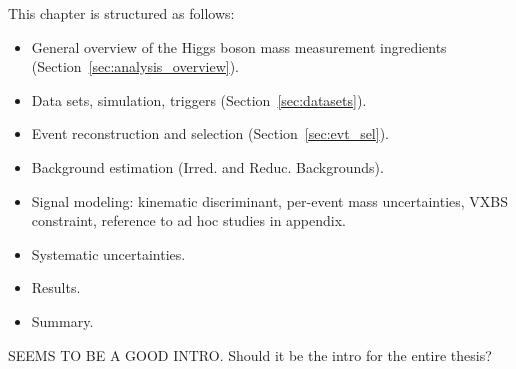 This chapter is structured as follows:
\begin{itemize}
    \item General overview of the Higgs boson mass measurement ingredients (Section~\ref{sec:analysis_overview}).
    \item Data sets, simulation, triggers (Section~\ref{sec:datasets}).
    \item Event reconstruction and selection (Section~\ref{sec:evt_sel}).
    \item Background estimation (Irred. and Reduc. Backgrounds).
    \item Signal modeling: kinematic discriminant, per-event mass uncertainties, VXBS constraint, reference to ad hoc studies in appendix.
    \item Systematic uncertainties.
    \item Results.
    \item Summary.
\end{itemize}

SEEMS TO BE A GOOD INTRO. Should it be the intro for the entire thesis?
